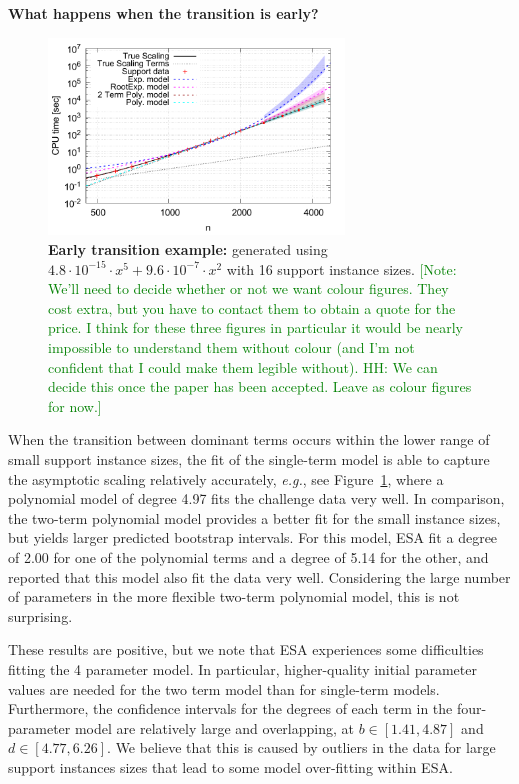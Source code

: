 \documentclass[aic]{iosart2x}
\newcommand{\eg}{\emph{e.g.}}
\newcommand{\note}[1]{\textcolor{green}{[Note: #1]}}
\begin{document}
\textbf{What happens when the transition is early?}
\begin{figure}[t]
\centering
\includegraphics[width=0.7\textwidth]{fittedModels-2-5-14-16s.pdf}
\caption{\textbf{Early transition example:} generated using $4.8\cdot 10^{-15} \cdot x^5 + 9.6\cdot 10^{-7} \cdot x^2$ with 16 support instance sizes. \note{We'll need to decide whether or not we want colour figures. They cost extra, but you have to contact them to obtain a quote for the price. I think for these three figures in particular it would be nearly impossible to understand them without colour (and I'm not confident that I could make them legible without). HH: We can decide this once the paper has been accepted. Leave as colour figures for now.}}
\label{fig:AA-competing-2-5-14-16s}
\end{figure}
When the transition between dominant terms occurs within the lower range of small support instance sizes, the fit of the single-term model is able to capture the asymptotic scaling relatively accurately, \eg{}, see Figure~\ref{fig:AA-competing-2-5-14-16s}, where a polynomial model of degree 4.97 fits the challenge data very well. In comparison, the two-term polynomial model provides a better fit for the small instance sizes, but yields larger predicted bootstrap intervals. For this model, ESA fit a degree of 2.00 for one of the polynomial terms and a degree of 5.14 for the other, and reported that this model also fit the data very well. 
Considering the large number of parameters in the more flexible two-term polynomial model, this is not surprising.

These results are positive, but we note that ESA experiences some difficulties fitting the 4 parameter model. 
In particular, higher-quality initial parameter values are needed for the two term model than for single-term models. Furthermore, the confidence intervals for the degrees of each term in the four-parameter model are relatively large and overlapping, at $b \in [1.41,4.87]$ and $d \in [4.77,6.26]$. 
We believe that this is caused by outliers in the data for large support instances sizes that lead to some model over-fitting within ESA.
\end{document}
